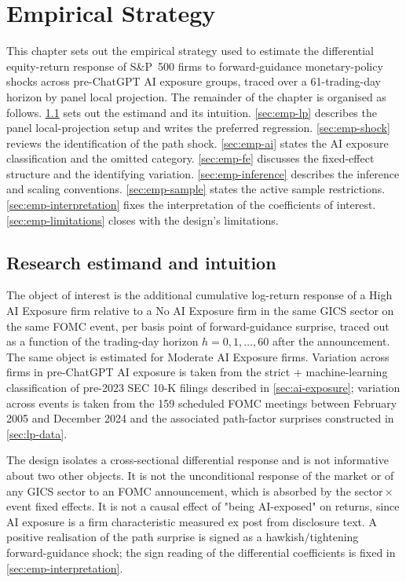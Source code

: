 \chapter{Empirical Strategy}
\label{ch:empirical_strategi}

This chapter sets out the empirical strategy used to estimate the differential equity-return response of S\&P~500 firms to forward-guidance monetary-policy shocks across pre-ChatGPT AI exposure groups, traced over a 61-trading-day horizon by panel local projection. The remainder of the chapter is organised as follows. \cref{sec:emp-estimand} sets out the estimand and its intuition. \cref{sec:emp-lp} describes the panel local-projection setup and writes the preferred regression. \cref{sec:emp-shock} reviews the identification of the path shock. \cref{sec:emp-ai} states the AI exposure classification and the omitted category. \cref{sec:emp-fe} discusses the fixed-effect structure and the identifying variation. \cref{sec:emp-inference} describes the inference and scaling conventions. \cref{sec:emp-sample} states the active sample restrictions. \cref{sec:emp-interpretation} fixes the interpretation of the coefficients of interest. \cref{sec:emp-limitations} closes with the design's limitations.

\section{Research estimand and intuition}
\label{sec:emp-estimand}

The object of interest is the additional cumulative log-return response of a High AI Exposure firm relative to a No AI Exposure firm in the same GICS sector on the same FOMC event, per basis point of forward-guidance surprise, traced out as a function of the trading-day horizon $h = 0, 1, \dots, 60$ after the announcement. The same object is estimated for Moderate AI Exposure firms. Variation across firms in pre-ChatGPT AI exposure is taken from the strict + machine-learning classification of pre-2023 SEC 10-K filings described in \cref{sec:ai-exposure}; variation across events is taken from the 159 scheduled FOMC meetings between February 2005 and December 2024 and the associated path-factor surprises constructed in \cref{sec:lp-data}.

The design isolates a cross-sectional differential response and is not informative about two other objects. It is not the unconditional response of the market or of any GICS sector to an FOMC announcement, which is absorbed by the sector\,$\times$\,event fixed effects. It is not a causal effect of "being AI-exposed" on returns, since AI exposure is a firm characteristic measured ex post from disclosure text. A positive realisation of the path surprise is signed as a hawkish/tightening forward-guidance shock; the sign reading of the differential coefficients is fixed in \cref{sec:emp-interpretation}.

